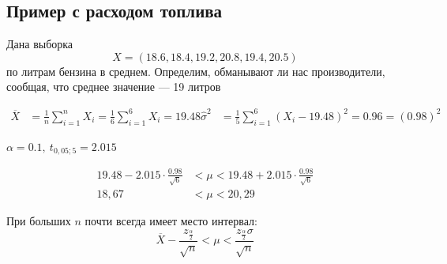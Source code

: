 \documentclass[a4paper, 10pt]{article}
\begin{document}
\subsection{Пример с расходом топлива}
Дана выборка 
\begin{equation*}
    X=(18.6,18.4,19.2,20.8,19.4,20.5)
\end{equation*}
по литрам бензина в среднем. Определим, обманывают ли нас производители, сообщая, что среднее значение — 19 литров

\begin{equation*}
    \begin{aligned}
        \overline{X}&=\frac{1}{n}\sum_{i=1}^nX_i=\frac{1}{6}\sum_{i=1}^6X_i=19.48
        \widehat{\sigma}^{2}&=\frac{1}{5} \sum_{i=1}^{6}\left(X_{i}-19.48\right)^{2}=0.96=(0.98)^{2}
    \end{aligned}
\end{equation*}

$\alpha=0.1,\ t_{0,05;5}=2.015$

\begin{equation*}
\begin{aligned}
    19.48-2.015 \cdot \frac{0.98}{\sqrt{6}}&<\mu<19.48+2.015 \cdot \frac{0.98}{\sqrt{6}}\\
    18,67&<\mu<20,29
\end{aligned}
\end{equation*}

\comment При больших $n$ почти всегда имеет место интервал:
\begin{equation*}
    \overline{X}-\frac{z_{\frac{\alpha}{2}}}{\sqrt{n}}<\mu<\frac{z_{\frac{\alpha}{2}} \sigma}{\sqrt{n}}
\end{equation*}
\end{document}
